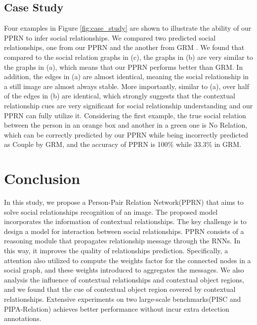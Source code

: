\documentclass{article}
\newcommand{\PPRN}{{\sf PPRN}}
\begin{document}

\subsection{Case Study}\label{section:cs}

Four examples in Figure \ref{fig:case_study} are shown to illustrate the ability of our {\PPRN} to infer social relationships. We compared two predicted social relationships, one from our {\PPRN} and the another from GRM \cite{DBLP:conf/ijcai/WangCRYCL18}. We found that compared to the social relation graphs in (c), the graphs in (b) are very similar to the graphs in (a), which means that our {\PPRN} performs better than GRM. In addition, the edges in (a) are almost identical, meaning the social relationship in a still image are almost always stable. More importantly, similar to (a), over half of the edges in (b) are identical, which strongly suggests that the contextual relationship cues are very significant for social relationship understanding and our {\PPRN} can fully utilize it. Considering the first example, the true social relation between the person in an orange box and another in a green one is No Relation, which can be correctly predicted by our {\PPRN} while being incorrectly predicted as Couple by GRM, and the accuracy of {\PPRN} is 100\% while 33.3\% in GRM.

\section{Conclusion}
In this study, we propose a Person-Pair Relation Network(\PPRN) that aims to solve social relationships recognition of an image. The proposed model incorporates the information of contextual relationships. The key challenge is to design a model for interaction between social relationships. {\PPRN} consists of a reasoning module that propagates relationship message through the RNNs. In this way, it improves the quality of relationships prediction. Specifically, a attention also utilized to compute the weights factor for the connected nodes in a social graph, and these weights introduced to aggregates the messages. We also analysis the influence of contextual relationships and contextual object regions, and we found that the cue of contextual object region covered by contextual relationships. Extensive experiments on two large-scale benchmarks(PISC and PIPA-Relation) achieves better performance  without incur extra detection annotations.

\newpage


\end{document}
